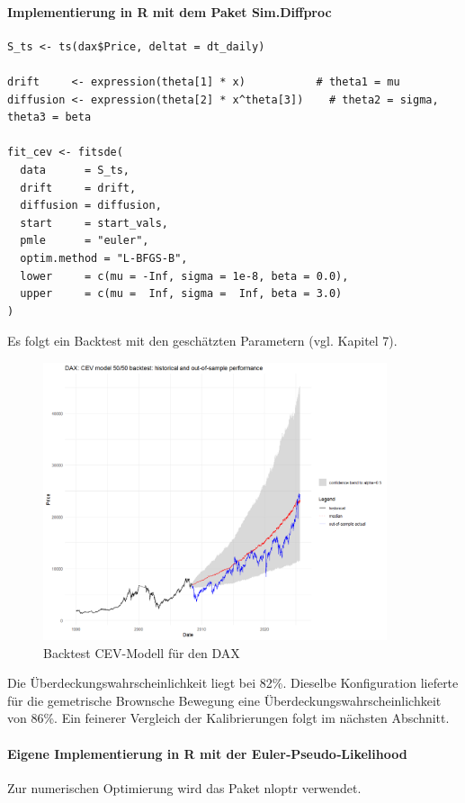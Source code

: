 \paragraph{Implementierung in R mit dem Paket Sim.Diffproc}

\begin{lstlisting}
S_ts <- ts(dax$Price, deltat = dt_daily)

drift     <- expression(theta[1] * x)           # theta1 = mu
diffusion <- expression(theta[2] * x^theta[3])    # theta2 = sigma, theta3 = beta

fit_cev <- fitsde(
  data      = S_ts,
  drift     = drift,
  diffusion = diffusion,
  start     = start_vals,
  pmle      = "euler",
  optim.method = "L-BFGS-B",
  lower     = c(mu = -Inf, sigma = 1e-8, beta = 0.0),
  upper     = c(mu =  Inf, sigma =  Inf, beta = 3.0)
)
\end{lstlisting}

Es folgt ein Backtest mit den geschätzten Parametern (vgl. Kapitel 7).

\begin{figure}[H]
    \centering
    \includegraphics[width=0.9\textwidth]{images/cev_dax_backtest.png}
    \caption{Backtest CEV-Modell für den DAX}
    \label{fig:cev_dax_backtest}
\end{figure}

Die Überdeckungswahrscheinlichkeit liegt bei 82\%. Dieselbe Konfiguration
lieferte für die gemetrische Brownsche Bewegung eine Überdeckungswahrscheinlichkeit von 86\%.
Ein feinerer Vergleich der Kalibrierungen folgt im nächsten Abschnitt. 

\paragraph{Eigene Implementierung in R mit der Euler‑Pseudo‑Likelihood}
Zur numerischen Optimierung wird das Paket nloptr \cite{nloptr} verwendet.

